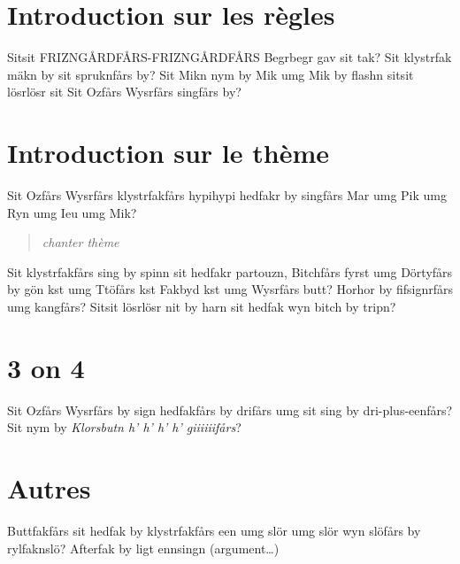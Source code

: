 \documentclass{article}
\begin{document}
\section{Introduction sur les règles}
Sitsit FRIZNGÅRDFÅRS-FRIZNGÅRDFÅRS Begrbegr gav sit tak?
Sit klystrfak mäkn by sit spruknfårs by?
Sit Mikn nym by Mik umg Mik by flashn sitsit lösrlösr sit Sit Ozfårs
Wysrfårs singfårs by?
\section{Introduction sur le thème}
Sit Ozfårs Wysrfårs klystrfakfårs hypihypi hedfakr by singfårs Mar umg Pik
umg Ryn umg Ieu umg Mik?
\begin{quote}\emph{chanter thème}\end{quote}
Sit klystrfakfårs sing by spinn sit hedfakr partouzn, Bitchfårs fyrst umg
Dörtyfårs by gön kst umg Ttöfårs kst Fakbyd kst umg Wysrfårs butt? Horhor by
fifsignrfårs umg kangfårs? Sitsit lösrlösr nit by harn sit hedfak wyn
bitch by tripn?
\section{3 on 4}
Sit Ozfårs Wysrfårs by sign hedfakfårs by drifårs umg sit sing by
dri-plus-eenfårs? Sit nym by \emph{Klorsbutn h' h' h' h' giiiiiifårs}?
\section{Autres}
Buttfakfårs sit hedfak by klystrfakfårs een umg slör umg slör wyn slöfårs by
rylfaknslö? Afterfak by ligt ennsingn (argument\ldots)
\end{document}

